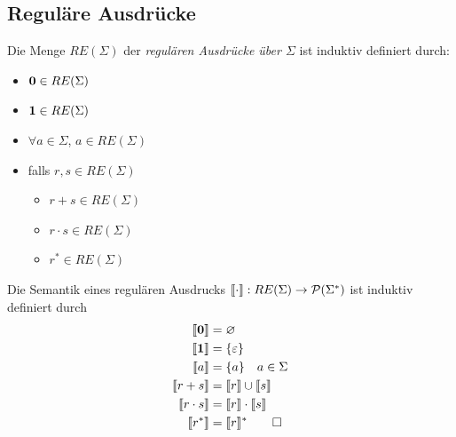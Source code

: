 \subsection{Reguläre Ausdrücke}
\begin{Def}[name={[RE($\Sigma$)]}]
        Die Menge $RE(\Sigma)$ der \emph{regulären Ausdrücke über $\Sigma$} ist induktiv definiert durch:
        \begin{itemize}
        \item $\mathbf{0}\in RE(\Sigma)$
        \item $\mathbf{1}\in RE(\Sigma)$
        \item $\forall a\in\Sigma$, $a\in RE(\Sigma)$
        \item falls $r,s\in RE(\Sigma)$
                \begin{itemize}[label=\textbullet]
                \item $r+s\in RE(\Sigma)$
                \item $r\cdot s\in RE(\Sigma)$
                \item $r^*\in RE(\Sigma)$
                \end{itemize}
        \end{itemize}
\end{Def}
\begin{Def}[name={[Semantik eines regulären Ausdrucks]}]
        Die Semantik eines regulären Ausdrucks $\llbracket\cdot \rrbracket : RE(\Sigma) \-> \mathcal{P}(\Sigma^*)$ ist induktiv definiert durch
        \begin{align*}
                \llbracket \mathbf{0} \rrbracket &= \varnothing\\
                \llbracket \mathbf{1} \rrbracket &= \{\varepsilon\}\\
                \llbracket a \rrbracket &= \{a\} \quad a\in\Sigma\\
                \llbracket r+s \rrbracket &= \llbracket r\rrbracket \cup \llbracket s\rrbracket\\
                \llbracket r\cdot s \rrbracket &= \llbracket r\rrbracket \cdot \llbracket s\rrbracket\\
                \llbracket r^* \rrbracket &= \llbracket r\rrbracket^* \qedhere
        \end{align*}
\end{Def}
%
